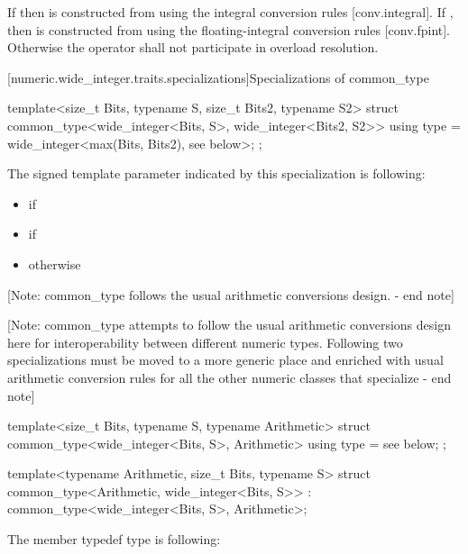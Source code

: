 \begin{itemdescr}
\returns If  then  is constructed from  using the integral conversion rules [conv.integral]. If , then  is constructed from  using the floating-integral conversion rules [conv.fpint]. Otherwise the operator shall not participate in overload resolution.
\end{itemdescr}

[numeric.wide_integer.traits.specializations]{Specializations of common_type}

\begin{itemdecl}
template<size_t Bits, typename S, size_t Bits2, typename S2>
struct common_type<wide_integer<Bits, S>, wide_integer<Bits2, S2>> {
    using type = wide_integer<max(Bits, Bits2), see below>;
};
\end{itemdecl}

The signed template parameter indicated by this specialization is following:

\begin{itemize}
\item {} if 
\item {} if 
\item {} otherwise
\end{itemize}

[Note: common_type follows the usual arithmetic conversions design. - end note]

[Note: common_type attempts to follow the usual arithmetic conversions design here for interoperability between different numeric types. Following two specializations must be moved to a more generic place and enriched with usual arithmetic conversion rules for all the other numeric classes that specialize - end note]

\begin{itemdecl}
template<size_t Bits, typename S, typename Arithmetic>
struct common_type<wide_integer<Bits, S>, Arithmetic> {
    using type = see below;
};

template<typename Arithmetic, size_t Bits, typename S>
struct common_type<Arithmetic, wide_integer<Bits, S>>
: common_type<wide_integer<Bits, S>, Arithmetic>;
\end{itemdecl}

The member typedef type is following:

